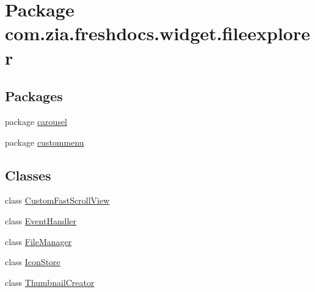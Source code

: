 \hypertarget{namespacecom_1_1zia_1_1freshdocs_1_1widget_1_1fileexplorer}{\section{Package com.\-zia.\-freshdocs.\-widget.\-fileexplorer}
\label{namespacecom_1_1zia_1_1freshdocs_1_1widget_1_1fileexplorer}
}
\subsection*{Packages}
\begin{DoxyCompactItemize}
\item 
package \hyperlink{namespacecom_1_1zia_1_1freshdocs_1_1widget_1_1fileexplorer_1_1carousel}{carousel}
\item 
package \hyperlink{namespacecom_1_1zia_1_1freshdocs_1_1widget_1_1fileexplorer_1_1custommenu}{custommenu}
\end{DoxyCompactItemize}
\subsection*{Classes}
\begin{DoxyCompactItemize}
\item 
class \hyperlink{classcom_1_1zia_1_1freshdocs_1_1widget_1_1fileexplorer_1_1_custom_fast_scroll_view}{Custom\-Fast\-Scroll\-View}
\item 
class \hyperlink{classcom_1_1zia_1_1freshdocs_1_1widget_1_1fileexplorer_1_1_event_handler}{Event\-Handler}
\item 
class \hyperlink{classcom_1_1zia_1_1freshdocs_1_1widget_1_1fileexplorer_1_1_file_manager}{File\-Manager}
\item 
class \hyperlink{classcom_1_1zia_1_1freshdocs_1_1widget_1_1fileexplorer_1_1_icon_store}{Icon\-Store}
\item 
class \hyperlink{classcom_1_1zia_1_1freshdocs_1_1widget_1_1fileexplorer_1_1_thumbnail_creator}{Thumbnail\-Creator}
\end{DoxyCompactItemize}
